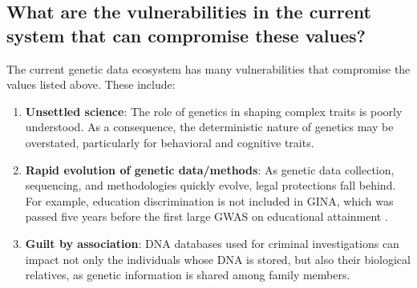 \subsection{What are the vulnerabilities in the current system that can compromise these values?}

The current genetic data ecosystem has many vulnerabilities that compromise the values listed above. These include:
\begin{enumerate}
    \item \textbf{Unsettled science}: The role of genetics in shaping complex traits is poorly understood. As a consequence, the deterministic nature of genetics may be overstated, particularly for behavioral and cognitive traits. 
    \item \textbf{Rapid evolution of genetic data/methods}: As genetic data collection, sequencing, and methodologies quickly evolve, legal protections fall behind. For example, education discrimination is not included in GINA, which was passed five years before the first large GWAS on educational attainment \cite{rietveld_gwas_2013}.
    \item \textbf{Guilt by association}: DNA databases used for criminal investigations can impact not only the individuals whose DNA is stored, but also their biological relatives, as genetic information is shared among family members. 
 

\end{enumerate}
